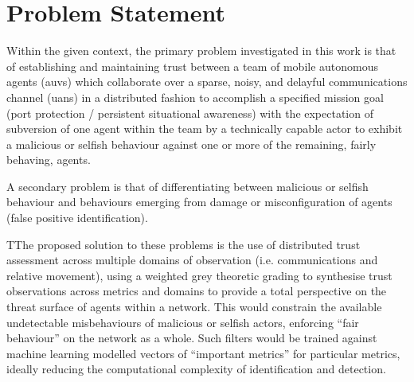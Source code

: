 \pagebreak

\section{Problem Statement}\label{sec:problem}

Within the given context, the primary problem investigated in this work is that of establishing and maintaining trust between a team of mobile autonomous agents (\glspl{auv}) which collaborate over a sparse, noisy, and delayful communications channel (\glspl{uan}) in a distributed fashion to accomplish a specified mission goal (port protection / persistent situational awareness) with the expectation of subversion of one agent within the team by a technically capable actor to exhibit a malicious or selfish behaviour against one or more of the remaining, fairly behaving, agents. 

A secondary problem is that of differentiating between malicious or selfish behaviour and behaviours emerging from damage or misconfiguration of agents (false positive identification).

TThe proposed solution to these problems is the use of distributed trust assessment across multiple domains of observation (i.e. communications and relative movement), using a weighted grey theoretic grading to synthesise trust observations across metrics and domains to provide a total perspective on the threat surface of agents within a network.
This would constrain the available undetectable misbehaviours of malicious or selfish actors, enforcing ``fair behaviour'' on the network as a whole.
Such filters would be trained against machine learning modelled vectors of ``important metrics'' for particular metrics, ideally reducing the computational complexity of identification and detection. 

